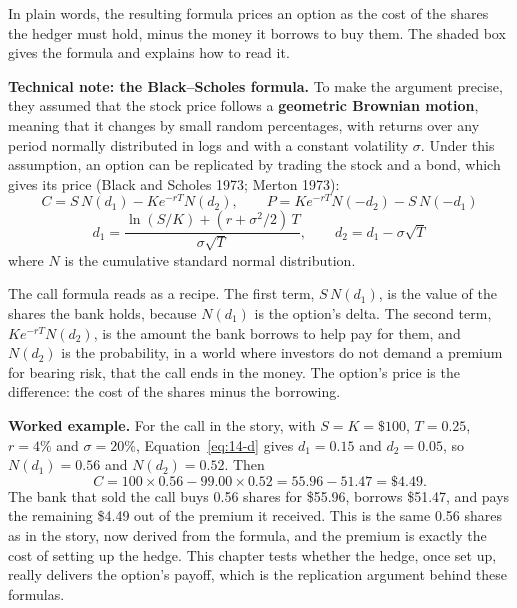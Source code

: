 In plain words, the resulting formula prices an option as the cost of the shares the hedger must hold, minus the money it borrows to buy them. The shaded box gives the formula and explains how to read it.

\begin{technote}
\textbf{Technical note: the Black--Scholes formula.} To make the argument precise, they assumed that the stock price follows a \textbf{geometric Brownian motion}, meaning that it changes by small random percentages, with returns over any period normally distributed in logs and with a constant volatility $\sigma$. Under this assumption, an option can be replicated by trading the stock and a bond, which gives its price (Black and Scholes 1973; Merton 1973):
\begin{equation}
  C = S\,N(d_1) - K e^{-rT} N(d_2), \qquad P = K e^{-rT} N(-d_2) - S\,N(-d_1)
  \label{eq:14-bs}
\end{equation}
\begin{equation}
  d_1 = \frac{\ln(S/K) + (r + \sigma^2/2)\,T}{\sigma\sqrt{T}}, \qquad d_2 = d_1 - \sigma\sqrt{T}
  \label{eq:14-d}
\end{equation}
where $N$ is the cumulative standard normal distribution.

The call formula reads as a recipe. The first term, $S\,N(d_1)$, is the value of the shares the bank holds, because $N(d_1)$ is the option's delta. The second term, $K e^{-rT} N(d_2)$, is the amount the bank borrows to help pay for them, and $N(d_2)$ is the probability, in a world where investors do not demand a premium for bearing risk, that the call ends in the money. The option's price is the difference: the cost of the shares minus the borrowing.
\end{technote}

\textbf{Worked example.} For the call in the story, with $S = K = \$100$, $T = 0.25$, $r = 4\%$ and $\sigma = 20\%$, Equation~\eqref{eq:14-d} gives $d_1 = 0.15$ and $d_2 = 0.05$, so $N(d_1) = 0.56$ and $N(d_2) = 0.52$. Then
\begin{equation}
  C = 100 \times 0.56 - 99.00 \times 0.52 = 55.96 - 51.47 = \$4.49.
  \label{eq:14-bs-example}
\end{equation}
The bank that sold the call buys 0.56 shares for \$55.96, borrows \$51.47, and pays the remaining \$4.49 out of the premium it received. This is the same 0.56 shares as in the story, now derived from the formula, and the premium is exactly the cost of setting up the hedge. This chapter tests whether the hedge, once set up, really delivers the option's payoff, which is the replication argument behind these formulas.

